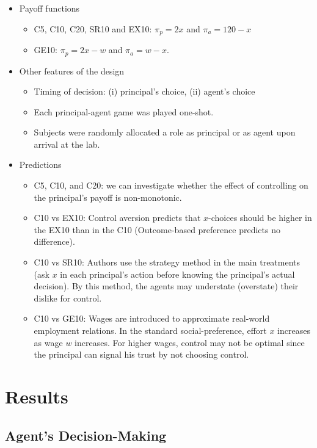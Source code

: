 \documentclass[../root]{subfiles}
\begin{document}
    \begin{itemize}
        \item Payoff functions
        \begin{itemize}
            \item C5, C10, C20, SR10 and EX10: $\pi_p = 2x$ and $\pi_a = 120 - x$
            \item GE10: $\pi_p = 2x - w$ and $\pi_a = w - x$.
        \end{itemize}
        \item Other features of the design
        \begin{itemize}
            \item Timing of decision: (i) principal's choice, (ii) agent's choice
            \item Each principal-agent game was played one-shot.
            \item Subjects were randomly allocated a role as principal or as agent upon arrival at the lab.
        \end{itemize}
        \item Predictions
        \begin{itemize}
            \item C5, C10, and C20: we can investigate whether the effect of controlling on the principal's payoff is non-monotonic.
            \item C10 vs EX10: Control aversion predicts that $x$-choices should be higher in the EX10 than in the C10 (Outcome-based preference predicts no difference).
            \item C10 vs SR10: Authors use the strategy method in the main treatments (ask $x$ in each principal's action before knowing the principal's actual decision). By this method, the agents may understate (overstate) their dislike for control.
            \item C10 vs GE10: Wages are introduced to approximate real-world employment relations. In the standard social-preference, effort $x$ increases as wage $w$ increases. For higher wages, control may not be optimal since the principal can signal his trust by not choosing control.  
        \end{itemize}
    \end{itemize}

    \section{Results}

    \subsection{Agent's Decision-Making}
\end{document}
